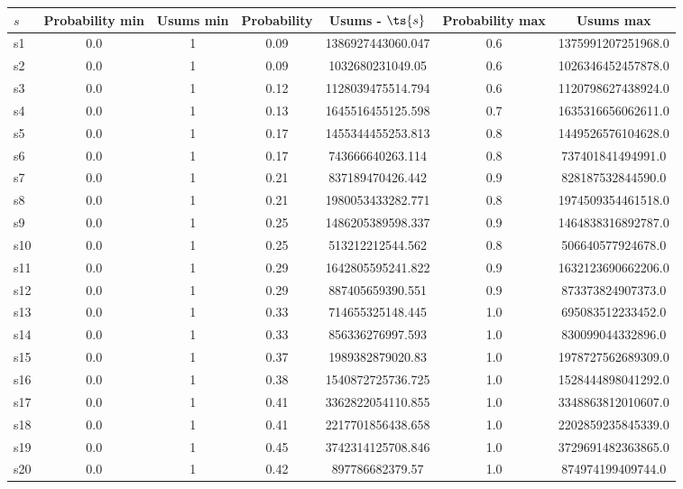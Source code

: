 \documentclass{article}
\begin{document}
\noindent\begin{tabular}{|l|c|c|c|c|c|c|}
\hline
$s$& Probability min & Usums min & Probability & Usums - $\ts{s}$ & Probability max & Usums max\\
\hline
s1 &0.0 & 1 & 0.09 & 1386927443060.047 & 0.6 & 1375991207251968.0\\
\hline
s2 &0.0 & 1 & 0.09 & 1032680231049.05 & 0.6 & 1026346452457878.0\\
\hline
s3 &0.0 & 1 & 0.12 & 1128039475514.794 & 0.6 & 1120798627438924.0\\
\hline
s4 &0.0 & 1 & 0.13 & 1645516455125.598 & 0.7 & 1635316656062611.0\\
\hline
s5 &0.0 & 1 & 0.17 & 1455344455253.813 & 0.8 & 1449526576104628.0\\
\hline
s6 &0.0 & 1 & 0.17 & 743666640263.114 & 0.8 & 737401841494991.0\\
\hline
s7 &0.0 & 1 & 0.21 & 837189470426.442 & 0.9 & 828187532844590.0\\
\hline
s8 &0.0 & 1 & 0.21 & 1980053433282.771 & 0.8 & 1974509354461518.0\\
\hline
s9 &0.0 & 1 & 0.25 & 1486205389598.337 & 0.9 & 1464838316892787.0\\
\hline
s10 &0.0 & 1 & 0.25 & 513212212544.562 & 0.8 & 506640577924678.0\\
\hline
s11 &0.0 & 1 & 0.29 & 1642805595241.822 & 0.9 & 1632123690662206.0\\
\hline
s12 &0.0 & 1 & 0.29 & 887405659390.551 & 0.9 & 873373824907373.0\\
\hline
s13 &0.0 & 1 & 0.33 & 714655325148.445 & 1.0 & 695083512233452.0\\
\hline
s14 &0.0 & 1 & 0.33 & 856336276997.593 & 1.0 & 830099044332896.0\\
\hline
s15 &0.0 & 1 & 0.37 & 1989382879020.83 & 1.0 & 1978727562689309.0\\
\hline
s16 &0.0 & 1 & 0.38 & 1540872725736.725 & 1.0 & 1528444898041292.0\\
\hline
s17 &0.0 & 1 & 0.41 & 3362822054110.855 & 1.0 & 3348863812010607.0\\
\hline
s18 &0.0 & 1 & 0.41 & 2217701856438.658 & 1.0 & 2202859235845339.0\\
\hline
s19 &0.0 & 1 & 0.45 & 3742314125708.846 & 1.0 & 3729691482363865.0\\
\hline
s20 &0.0 & 1 & 0.42 & 897786682379.57 & 1.0 & 874974199409744.0\\
\hline
\end{tabular}\\
\end{document}
